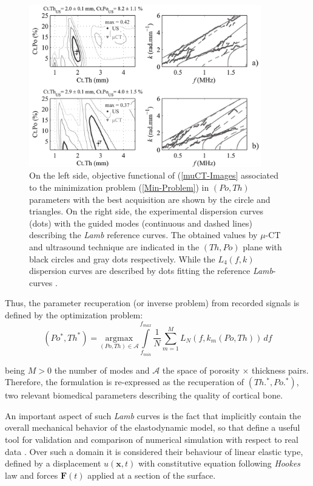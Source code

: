\begin{figure}[!h]
	\centering
	\includegraphics[width=0.9\textwidth]{images/ImgExt/FKDiagramTwoCases.png}
	\caption{On the left side, objective functional of (\ref{muCT-Images} associated to the minimization problem (\ref{Min-Problem}) in $(Po, Th)$ parameters with the best acquisition are shown by the circle and triangles. On the right side, the experimental dispersion curves (dots) with the guided modes (continuous and dashed lines) describing the \textit{Lamb} reference curves. The obtained values by $\mu$-CT and ultrasound technique are indicated in the $(Th, Po)$ plane with black circles and gray dots respectively. While the $L_4(f,k)$ dispersion curves are described by dots fitting the reference \textit{Lamb}-curves \cite{Minonzio2018}.}
	\label{RealLM-Images}
\end{figure}

Thus, the parameter recuperation (or inverse problem) from recorded signals is defined by the optimization problem:
\begin{equation}
    (Po^*, Th^*) = \underset{(Po, Th) \in \mathcal{A}}{\text{argmax}} \int\limits_{f_{min}}^{f_{max}} \frac{1}{N} \sum_{m=1}^{M} L_N(f, k_m(Po, Th)) \,df 
    \label{Min-Problem}
\end{equation}

being $M>0$ the number of modes and $\mathcal{A}$ the space of porosity $\times$ thickness pairs. Therefore, the formulation is re-expressed as the recuperation of $(Th.^*, Po.^*)$, two relevant biomedical parameters describing the quality of cortical bone.

An important aspect of such \textit{Lamb} curves is the fact that implicitly contain the overall mechanical behavior of the elastodynamic model, so that define a useful tool for validation and comparison of numerical simulation with respect to real data  \cite{Rhee2007}. Over such a domain it is considered their behaviour of linear elastic type, defined by a displacement $u(\mathbf{x},t)$ with constitutive equation following \textit{Hookes} law and forces $\mathbf{F}(t)$ applied at a section of the surface.

